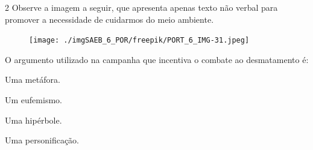 
\num{2} Observe a imagem a seguir, que apresenta apenas texto não verbal
para promover a necessidade de cuidarmos do meio ambiente.

\begin{figure}[H]
\centering\texttt{[image: ./imgSAEB\_6\_POR/freepik/PORT\_6\_IMG-31.jpeg]}
\end{figure}

\noindent O argumento utilizado na campanha que incentiva o combate ao
desmatamento é:

\pagebreak
\begin{escolha}
\item Uma metáfora.
\item Um eufemismo.
\item Uma hipérbole.
\item Uma personificação.
\end{escolha}



